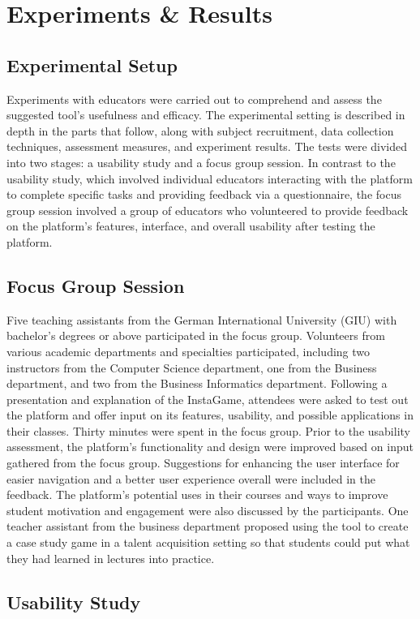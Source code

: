 \chapter{Experiments \& Results}\label{chap:results}

\section{Experimental Setup}

Experiments with educators were carried out to comprehend and assess the suggested tool's usefulness and efficacy. The experimental setting is described in depth in the parts that follow, along with subject recruitment, data collection techniques, assessment measures, and experiment results. The tests were divided into two stages: a usability study and a focus group session. In contrast to the usability study, which involved individual educators interacting with the platform to complete specific tasks and providing feedback via a questionnaire, the focus group session involved a group of educators who volunteered to provide feedback on the platform's features, interface, and overall usability after testing the platform.


\section{Focus Group Session}

Five teaching assistants from the German International University (GIU) with bachelor's degrees or above participated in the focus group. Volunteers from various academic departments and specialties participated, including two instructors from the Computer Science department, one from the Business department, and two from the Business Informatics department. Following a presentation and explanation of the InstaGame, attendees were asked to test out the platform and offer input on its features, usability, and possible applications in their classes. Thirty minutes were spent in the focus group. Prior to the usability assessment, the platform's functionality and design were improved based on input gathered from the focus group. Suggestions for enhancing the user interface for easier navigation and a better user experience overall were included in the feedback. The platform's potential uses in their courses and ways to improve student motivation and engagement were also discussed by the participants. One teacher assistant from the business department proposed using the tool to create a case study game in a talent acquisition setting so that students could put what they had learned in lectures into practice.


\section{Usability Study}
